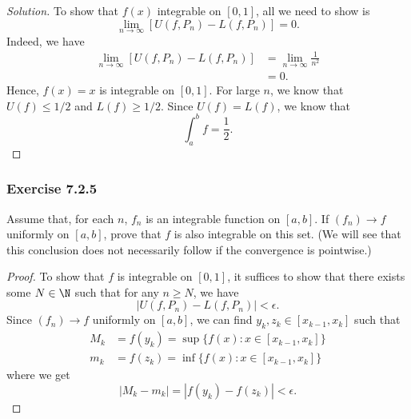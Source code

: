 \begin{enumerate}
		\begin{proof}[Solution]
			To show that \( f(x)  \) integrable on \( [0,1] \), all we need to show is 
			\[  \lim_{ n \to \infty  }  [ U(f, P_{n}) - L(f, P_{n })] = 0.  \]
			Indeed, we have 
			\begin{align*}
			    \lim_{ n \to \infty  }  [ U(f, P_{n}) - L(f, P_{n })] &= \lim_{ n \to \infty  } \frac{ 1 }{ n^2 }  \\
																	  &= 0. 
			\end{align*}
			Hence, \( f(x) = x  \) is integrable on \( [0,1] \). For large \( n  \), we know that 
			\( U(f) \leq 1 /2  \) and \( L(f) \geq 1 / 2  \). Since \( U(f) = L(f)  \), we know that 
			\[  \int_{ a }^{ b } f  = \frac{ 1 }{ 2 }. \]
		\end{proof}
\end{enumerate}

\subsubsection{Exercise 7.2.5} Assume that, for each \( n  \), \( f_{n} \) is an integrable function on \( [a,b]  \). If \( (f_n) \to f  \) uniformly on \( [a,b]   \), prove that \( f  \) is also integrable on this set. (We will see that this conclusion does not necessarily follow if the convergence is pointwise.)
\begin{proof}
	To show that \( f  \) is integrable on \( [0,1]  \), it suffices to show that there exists some \( N \in \N  \) such that for any \( n \geq N  \), we have 
	\[  | U(f, P_{n}) - L(f, P_{n})  | < \epsilon. \]
	Since \( (f_n) \to f  \) uniformly on \( [a,b]  \), we can find \( y_{k}, z_{k} \in [x_{k-1}, x_{k} ]  \) such that 
	\begin{align*}
		M_{k } &= f(y_{k }) = \sup \{ f(x) : x \in [x_{k-1} , x_{k }] \}  \\
		m_{k } 	   &= f(z_{k })  = \inf \{ f(x) : x \in [ x_{k-1} , x_{k }] \} 
	\end{align*}
	where we get 
	\[  | M_k - m_k  | = | f(y_{ k }) - f( z_{k} )  | < \epsilon. \]
\end{proof}







